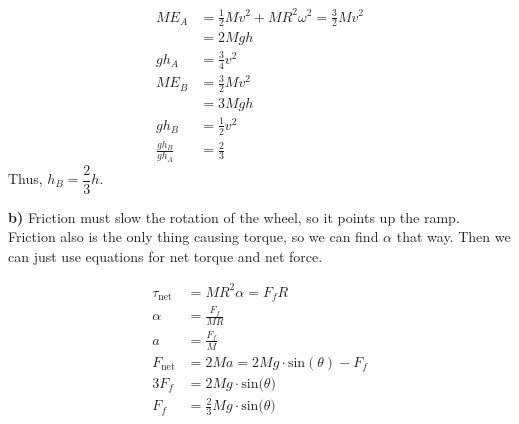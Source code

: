 \documentclass{article}
\begin{document}
\begin{align*}
    ME_A &= \frac{1}{2}Mv^2 + MR^2\omega^2 =\frac{3}{2}Mv^2\\
    &= 2Mgh\\
    gh_A &=\frac{3}{4}v^2 \\
    ME_B &= \frac{3}{2}Mv^2 \\
    &= 3Mgh \\
    gh_B &= \frac{1}{2}v^2 \\
    \frac{gh_B}{gh_A} &= \frac{2}{3}
\end{align*}
Thus, $h_B=\dfrac{2}{3}h$.

\vspace{1cm}

\noindent\textbf{b)} Friction must slow the rotation of the wheel, so it points up the ramp. Friction also is the only thing causing torque, so we can find $\alpha$ that way. Then we can just use equations for net torque and net force.  

\begin{align*}
    \tau_\text{net}&= MR^2\alpha = F_f R \\
    \alpha &= \frac{F_f}{MR} \\
    a &= \frac{F_f}{M} \\
    F_\text{net} &= 2Ma= 2Mg\cdot\text{sin}(\theta)-F_f \\
    3F_f&=2Mg\cdot\text{sin($\theta$)} \\
    F_f&=\frac{2}{3}Mg\cdot\text{sin($\theta$)}
\end{align*}
\end{document}

